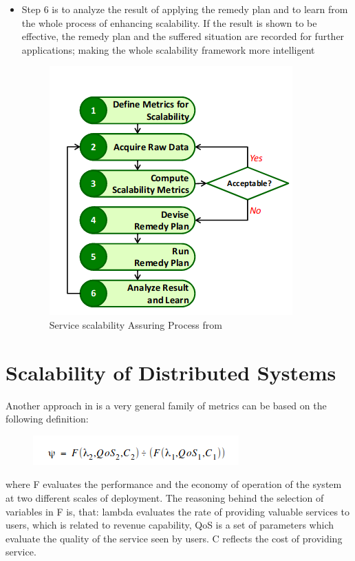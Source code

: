 \begin{itemize}
\item Step 6 is to analyze the result of applying the remedy plan and to learn from the whole process of enhancing scalability. If the result is shown to be effective, the remedy plan and the suffered situation are recorded for further applications; making the whole scalability framework more intelligent
\begin{figure}[h]
	\centering
	\includegraphics[width=0.7\linewidth]{figures/ServiceScalability}
	\caption{Service scalability Assuring Process from \cite{lee_software_2010}}
	\label{fig:servicescalability}
\end{figure}

\end{itemize}


\section{Scalability of Distributed Systems}

Another approach in \cite{jogalekar_evaluating_2000} is a very general family of metrics can be based on the following definition:

\begin{figure}[h]
	\centering
	\includegraphics[width=0.5\linewidth]{figures/scalingformula}
	{\caption*{}}
	\label{}
\end{figure}
where F evaluates the performance and the economy of operation of the system at two different scales of deployment. The reasoning behind the selection of variables in F is, that: lambda evaluates the rate of providing valuable services to users, which is related to revenue capability, QoS is a set of parameters which evaluate the quality of the service seen by users. C reflects the cost of providing service.

